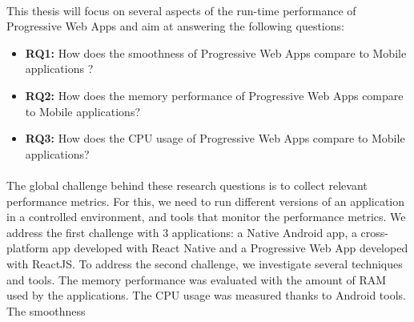 \documentclass{kththesis}
\begin{document}
\paragraph{}
This thesis will focus on several aspects of the run-time performance of Progressive Web Apps and aim at answering the following questions: 

\begin{itemize}
    \item \textbf{RQ1:} How does the smoothness of Progressive Web Apps compare to Mobile applications ? 
    
    \item \textbf{RQ2:} How does the memory performance of Progressive Web Apps compare to Mobile applications? 
    \item \textbf{RQ3:} How does the CPU usage of Progressive Web Apps compare to Mobile applications?
    
\end{itemize}

\paragraph{}
The global challenge behind these research questions is to collect relevant performance metrics. For this, we need to run different versions of an application in a controlled environment, and tools that monitor the performance metrics. \newline
We address the first challenge with 3 applications: a Native Android app, a cross-platform app developed with React Native and a Progressive Web App developed with ReactJS. 
To address the second challenge, we investigate several techniques and tools. The memory performance was evaluated with the amount of RAM used by the applications. The CPU usage was measured thanks to Android tools. The smoothness  
\end{document}
